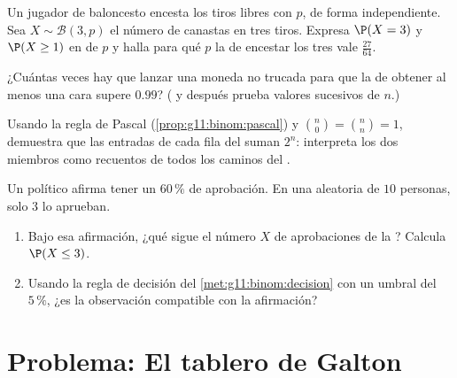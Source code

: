 \begin{exercise}[$\star\star$]\label{exo:g11:binom:8}
Un jugador de baloncesto encesta los tiros libres con  $p$, de
forma independiente. Sea $X \sim \mathcal B(3, p)$ el número de canastas
en tres tiros. Expresa $\P(X = 3)$ y $\P(X \geq 1)$ en  de $p$ y
halla para qué $p$ la  de encestar los tres vale
$\frac{27}{64}$.
\end{exercise}

\begin{exercise}[$\star\star$]\label{exo:g11:binom:9}
¿Cuántas veces hay que lanzar una moneda no trucada para que la
 de obtener al menos una cara supere $0.99$? ( y después prueba valores sucesivos de $n$.)
\end{exercise}

\begin{exercise}[$\star\star$]\label{exo:g11:binom:10}
Usando la regla de Pascal (\cref{prop:g11:binom:pascal}) y
$\binom n0 = \binom nn = 1$, demuestra que las entradas de cada fila del
 suman $2^n$: interpreta los dos miembros como
recuentos de todos los caminos del .
\end{exercise}

\begin{exercise}[$\star\star\star$]\label{exo:g11:binom:11}
Un político afirma tener un $60\,\%$ de aprobación. En una 
aleatoria de $10$ personas, solo $3$ lo aprueban.
\begin{enumerate}
  \item Bajo esa afirmación, ¿qué  sigue el número $X$ de
        aprobaciones de la ? Calcula $\P(X \leq 3)$.
  \item Usando la regla de decisión del \cref{met:g11:binom:decision} con
        un umbral del $5\,\%$, ¿es la observación compatible con la
        afirmación?
\end{enumerate}
\end{exercise}

\section{Problema: El tablero de Galton}

